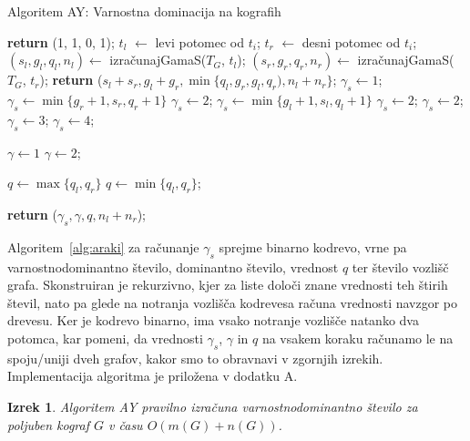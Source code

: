 \documentclass[12pt,a4paper,twoside]{article}
\theoremstyle{definition} %
\theoremstyle{plain} %
\newtheorem{izrek}[definicija]{Izrek}
\numberwithin{equation}{section}  %
\begin{document}
\begin{algorithm}[h]
\caption{Algoritem AY: Varnostna dominacija na kografih}\label{alg:araki}
\begin{algorithmic}[1]
   \textbf{return} (1, 1, 0, 1); \EndIf
  \State $t_l$ $\leftarrow$ levi potomec od $t_i$;
  \State $t_r$ $\leftarrow$ desni potomec od $t_i$;
  \State $(s_l, g_l, q_l, n_l) \leftarrow$ izračunajGamaS($T_G$, $t_l$);
  \State $(s_r, g_r, q_r, n_r) \leftarrow$ izračunajGamaS($T_G$, $t_r$);
  \State \textbf{return} ($s_l + s_r, g_l + g_r, \min\{q_l, g_r, g_l, q_r), n_l + n_r\}$;
  \Else
  	 $\gamma_s \leftarrow 1$;
    	 $\gamma_s \leftarrow \min\{g_r + 1, s_r, q_r + 1\}$ \Else \State $\gamma_s \leftarrow 2$; \EndIf
  		 $\gamma_s \leftarrow \min\{g_l + 1, s_l, q_l + 1\}$ \Else   \State$\gamma_s \leftarrow 2$; \EndIf
  	\Else
    	 $\gamma_s \leftarrow 2$;
  		 $\gamma_s \leftarrow 3$;
  		\Else
  		    \State $\gamma_s \leftarrow 4$; \EndIf
  	\EndIf
  \EndIf
  
   $\gamma \leftarrow 1$
  \Else
    \State $\gamma \leftarrow 2$;
  \EndIf
  
   $q \leftarrow \max\{q_l, q_r\}$
  \Else
    \State $q \leftarrow \min\{q_l, q_r\}$;
  \EndIf
  
  \State \textbf{return} ($\gamma_s, \gamma, q, n_l + n_r$);
\EndFunction
\end{algorithmic}
\end{algorithm}
Algoritem~\ref{alg:araki} za računanje $\gamma_s$ sprejme binarno kodrevo, vrne pa varnostnodominantno število, dominantno število, vrednost $q$ ter število vozlišč grafa. Skonstruiran je rekurzivno, kjer za liste določi znane vrednosti teh štirih števil, nato pa glede na notranja vozlišča kodrevesa računa vrednosti navzgor po drevesu. Ker je kodrevo binarno, ima vsako notranje vozlišče natanko dva potomca, kar pomeni, da vrednosti $\gamma_s$, $\gamma$ in $q$ na vsakem koraku računamo le na spoju/uniji dveh grafov, kakor smo to obravnavi v zgornjih izrekih.
Implementacija algoritma je priložena v dodatku A.
\begin{izrek}
Algoritem AY pravilno izračuna varnostnodominantno število za poljuben kograf $G$ v času $O(m(G) + n(G))$.
\end{izrek}
\end{document}
